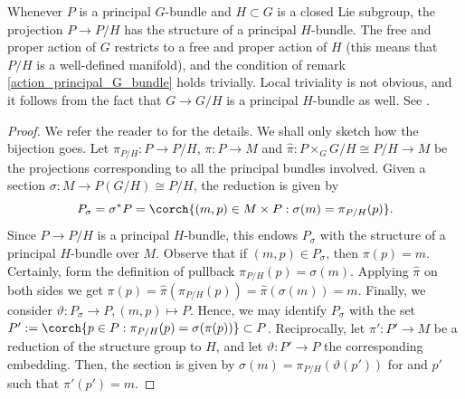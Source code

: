 \begin{obs} \label{obs_PH_prinipal_bundle}
    Whenever \(P\) is a principal \(G\)-bundle and \(H \subset G\) is a closed Lie subgroup, the projection \(P \to P/H\) has the structure of a principal \(H\)-bundle. The free and proper action of \(G\) restricts to a free and proper action of \(H\) (this means that \(P/H\) is a well-defined manifold), and the condition of remark \ref{action_principal_G_bundle} holds trivially. Local triviality is not obvious, and it follows from the fact that \(G\to G/H\) is a principal \(H\)-bundle as well. See \parencite[I Prop. 5.5]{kobayashi_vol1}.
\end{obs}

\begin{proof}
    We refer the reader to \parencite[I Prop. 5.6]{kobayashi_vol1} for the details. We shall only sketch how the bijection goes. Let \(\pi_{P/H}\colon P \to P/H\), \(\pi\colon P\to M\) and \(\hat{\pi}\colon P\times_G G/H \cong P/H \to M\) be the projections corresponding to all the principal bundles involved. Given a section \(\sigma\colon M \to P(G/H)\cong P/H\), the reduction is given by 
    \[
    P_\sigma=\sigma^*P=\corch{(m,p)\in M \times P: \sigma(m)=\pi_{P/H}(p)}.
    \]
    Since \(P\to P/H\) is a principal \(H\)-bundle, this endows \(P_\sigma\) with the structure of a principal \(H\)-bundle over \(M\). Observe that if \((m,p)\in P_\sigma\), then \(\pi(p)=m\). Certainly, form the definition of pullback \(\pi_{P/H}(p)=\sigma(m)\). Applying \(\hat{\pi}\) on both sides we get \(\pi(p)=\hat\pi(\pi_{P/H}(p))=\hat{\pi}(\sigma(m))=m\). Finally, we consider \(\vartheta\colon P_\sigma \to P, (m,p) \mapsto P\). Hence, we may identify \(P_\sigma\) with the set \(P':=\corch{p \in P: \pi_{P/H}(p)=\sigma(\pi(p))}\subset P\). Reciprocally, let \(\pi'\colon P'\to M\) be a reduction of the structure group to \(H\), and let \(\vartheta\colon P'\to P\) the corresponding embedding. Then, the section is given by \(\sigma(m)=\pi_{P/H}(\vartheta(p'))\) for and \(p'\) such that \(\pi'(p')=m\).
\end{proof}

